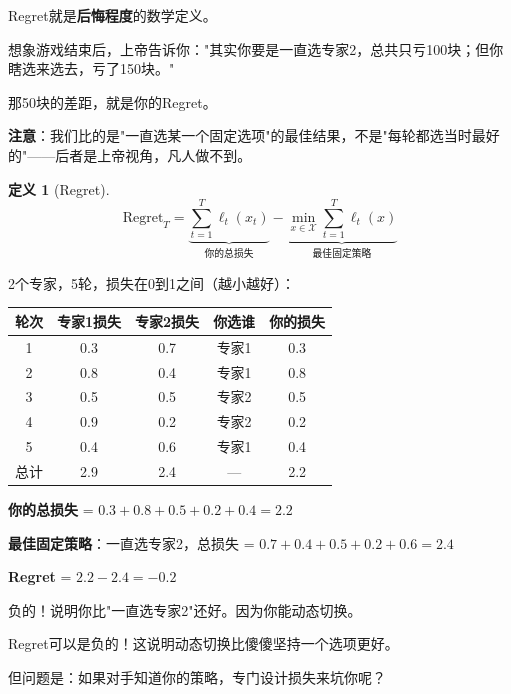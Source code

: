 \documentclass[11pt,a4paper]{article}
\theoremstyle{definition}
\newtheorem{definition}{定义}[section]
\begin{document}
\begin{plainwords}
Regret就是\textbf{后悔程度}的数学定义。

想象游戏结束后，上帝告诉你："其实你要是一直选专家2，总共只亏100块；但你瞎选来选去，亏了150块。"

那50块的差距，就是你的Regret。

\textbf{注意}：我们比的是"一直选某一个固定选项"的最佳结果，不是"每轮都选当时最好的"——后者是上帝视角，凡人做不到。
\end{plainwords}

\begin{definition}[Regret]
\[
\text{Regret}_T = \underbrace{\sum_{t=1}^T \ell_t(x_t)}_{\text{你的总损失}} - \underbrace{\min_{x \in \mathcal{X}} \sum_{t=1}^T \ell_t(x)}_{\text{最佳固定策略}}
\]
\end{definition}

\begin{calculation}[Regret的具体计算]
2个专家，5轮，损失在0到1之间（越小越好）：

\begin{center}
\begin{tabular}{c|cc|c|c}
\toprule
轮次 & 专家1损失 & 专家2损失 & 你选谁 & 你的损失 \\
\midrule
1 & 0.3 & 0.7 & 专家1 & 0.3 \\
2 & 0.8 & 0.4 & 专家1 & 0.8 \\
3 & 0.5 & 0.5 & 专家2 & 0.5 \\
4 & 0.9 & 0.2 & 专家2 & 0.2 \\
5 & 0.4 & 0.6 & 专家1 & 0.4 \\
\midrule
总计 & 2.9 & 2.4 & — & 2.2 \\
\bottomrule
\end{tabular}
\end{center}

\textbf{你的总损失} = $0.3 + 0.8 + 0.5 + 0.2 + 0.4 = 2.2$

\textbf{最佳固定策略}：一直选专家2，总损失 = $0.7 + 0.4 + 0.5 + 0.2 + 0.6 = 2.4$

\textbf{Regret} = $2.2 - 2.4 = -0.2$

负的！说明你比"一直选专家2"还好。因为你能动态切换。
\end{calculation}

\begin{plainwords}[负的Regret？]
Regret可以是负的！这说明动态切换比傻傻坚持一个选项更好。

但问题是：如果对手知道你的策略，专门设计损失来坑你呢？
\end{plainwords}
\end{document}

